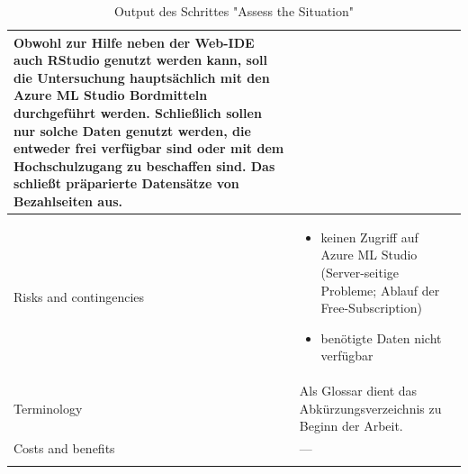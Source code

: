 \begin{centering}
\begin{longtable}[H]{|p{}|p{10cm}|}
Obwohl zur Hilfe neben der Web-IDE auch RStudio genutzt werden kann, soll die Untersuchung hauptsächlich mit den Azure ML Studio Bordmitteln durchgeführt werden. \newline
Schließlich sollen nur solche Daten genutzt werden, die entweder frei verfügbar sind oder mit dem Hochschulzugang zu beschaffen sind. Das schließt präparierte Datensätze von Bezahlseiten aus.\\
\hline
Risks and contingencies & \begin{itemize}
\item keinen Zugriff auf Azure ML Studio (Server-seitige Probleme; Ablauf der Free-Subscription)
\item benötigte Daten nicht verfügbar
\end{itemize} \\
\hline
Terminology & Als Glossar dient das Abkürzungsverzeichnis zu Beginn der Arbeit. \\
\hline
Costs and benefits & --- \\
\hline
\caption{Output des Schrittes "Assess the Situation"}
\end{longtable} \end{centering}

